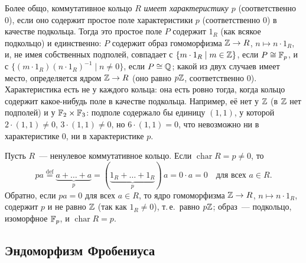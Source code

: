 \begin{remark}[1.4]
Более общо, коммутативное кольцо $R$ \emph{имеет характеристику $p$} (соответственно $0$), если оно содержит простое поле
характеристики $p$ (соответственно $0$) в качестве подкольца. Тогда это простое поле $P$ содержит $1_R$ (как всякое
подкольцо) и единственно: $P$ содержит образ гомоморфизма $\mathbb Z\to R$, $n\mapsto n\cdot1_R$, и, не имея собственных
подполей, совпадает с $\{m\cdot1_R\mid m\in\mathbb Z\}$, если $P\cong\mathbb F_p$, и с $\{(m\cdot1_R)(n\cdot1_R)^{-1}\mid n\ne0\}$, если
$P\cong\mathbb Q$; какой из двух случаев имеет место, определяется ядром $\mathbb Z\to R$ (оно равно $p\mathbb Z$, соответственно $0$). Характеристика есть не у каждого кольца: она есть ровно тогда, когда кольцо содержит какое-нибудь поле в
качестве подкольца. Например, её нет у $\mathbb Z$ (в $\mathbb Z$ нет подполей) и у $\mathbb F_2\times\mathbb F_3$: подполе содержало бы единицу
$(1,1)$, у которой $2\cdot(1,1)\ne0$, $3\cdot(1,1)\ne0$, но $6\cdot(1,1)=0$, что невозможно ни в характеристике $0$, ни в
характеристике $p$.

Пусть $R$~--- ненулевое коммутативное кольцо. Если $\operatorname{char}R=p\ne0$, то
\[
pa\overset{\text{def}}=\underbrace{a+\dots+a}_{p}=(\underbrace{1_R+\dots+1_R}_{p})\,a=0\cdot a=0
\quad\text{для всех }a\in R.
\]
Обратно, если $pa=0$ для всех $a\in R$, то ядро гомоморфизма $\mathbb Z\to R$, $n\mapsto n\cdot1_R$, содержит $p$ и не равно $\mathbb Z$
(так как $1_R\ne0$), т.\,е.\ равно $p\mathbb Z$; образ~--- подкольцо, изоморфное $\mathbb F_p$, и $\operatorname{char}R=p$.
\end{remark}

\subsection*{Эндоморфизм Фробениуса}

